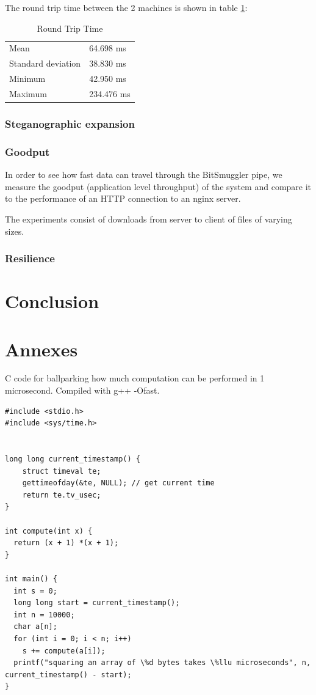 \documentclass[11pt]{book} %
\newcommand{\projectName}{BitSmuggler }
\begin{document}
The round trip time between the 2 machines is shown in table \ref{table:rtt}:

\begin{table}[!htbp]
    \begin{tabular}{|l|l|}
    \hline
    Mean               & 64.698 ms  \\
    Standard deviation & 38.830 ms  \\
    Minimum            & 42.950 ms  \\
    Maximum            & 234.476 ms \\ \hline
    \end{tabular}
    \caption {Round Trip Time}
   \label{table:rtt}
\end{table}

\subsection{Steganographic expansion}

\subsection{Goodput}

In order to see how fast data can travel through the \projectName pipe, we measure the goodput (application level throughput) of the system and compare it to the performance of an HTTP connection to an nginx server.

The experiments consist of downloads from server to client of files of varying sizes.

\subsection{Resilience}

\chapter{Conclusion}

\chapter{Annexes}


\label{cballpark}
C code for ballparking how much computation can be performed in 1 microsecond.
Compiled with g++ -Ofast.
\begin{lstlisting}
#include <stdio.h>
#include <sys/time.h>


long long current_timestamp() {
    struct timeval te; 
    gettimeofday(&te, NULL); // get current time
    return te.tv_usec;
}

int compute(int x) {
  return (x + 1) *(x + 1);
}

int main() {
  int s = 0;
  long long start = current_timestamp(); 
  int n = 10000;
  char a[n];
  for (int i = 0; i < n; i++)
    s += compute(a[i]);
  printf("squaring an array of \%d bytes takes \%llu microseconds", n, current_timestamp() - start);
}
\end{lstlisting}




\end{document}
